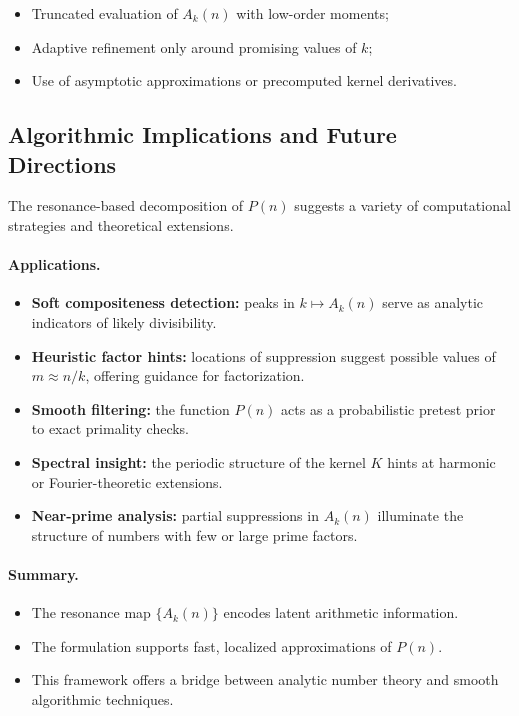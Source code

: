 \documentclass[12pt]{article}
\theoremstyle{definition}
\theoremstyle{plain}
\theoremstyle{remark}
\begin{document}
\begin{itemize}
  \item Truncated evaluation of \( A_k(n) \) with low-order moments;
  \item Adaptive refinement only around promising values of \( k \);
  \item Use of asymptotic approximations or precomputed kernel derivatives.
\end{itemize}

\subsection{Algorithmic Implications and Future Directions}

The resonance-based decomposition of \( P(n) \) suggests a variety of computational strategies and theoretical extensions.

\paragraph{Applications.}
\begin{itemize}
  \item \textbf{Soft compositeness detection:} peaks in \( k \mapsto A_k(n) \) serve as analytic indicators of likely divisibility.
  \item \textbf{Heuristic factor hints:} locations of suppression suggest possible values of \( m \approx n/k \), offering guidance for factorization.
  \item \textbf{Smooth filtering:} the function \( P(n) \) acts as a probabilistic pretest prior to exact primality checks.
  \item \textbf{Spectral insight:} the periodic structure of the kernel \( K \) hints at harmonic or Fourier-theoretic extensions.
  \item \textbf{Near-prime analysis:} partial suppressions in \( A_k(n) \) illuminate the structure of numbers with few or large prime factors.
\end{itemize}

\paragraph{Summary.}
\begin{itemize}
  \item The resonance map \( \{A_k(n)\} \) encodes latent arithmetic information.
  \item The formulation supports fast, localized approximations of \( P(n) \).
  \item This framework offers a bridge between analytic number theory and smooth algorithmic techniques.
\end{itemize}
\end{document}
